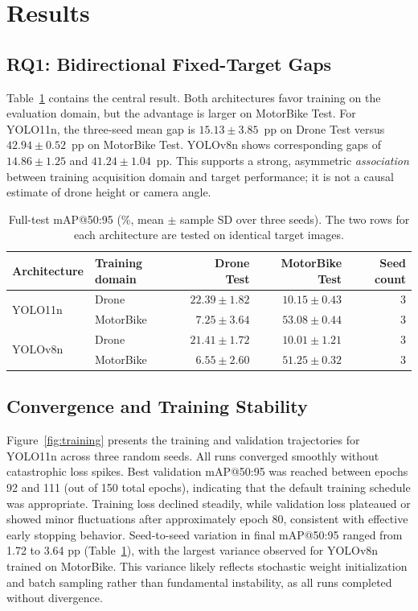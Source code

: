\documentclass[conference,a4paper]{IEEEtran}
\begin{document}
\section{Results}
\subsection{RQ1: Bidirectional Fixed-Target Gaps}
Table~\ref{tab:matrix} contains the central result. Both architectures favor training on the evaluation domain, but the advantage is larger on MotorBike Test. For YOLO11n, the three-seed mean gap is $15.13\pm3.85$~pp on Drone Test versus $42.94\pm0.52$~pp on MotorBike Test. YOLOv8n shows corresponding gaps of $14.86\pm1.25$ and $41.24\pm1.04$~pp. This supports a strong, asymmetric \emph{association} between training acquisition domain and target performance; it is not a causal estimate of drone height or camera angle.

\begin{table}[t]
\centering
\caption{Full-test mAP@50:95 (\%, mean $\pm$ sample SD over three seeds). The two rows for each architecture are tested on identical target images.}\label{tab:matrix}
\begin{tabular}{llrrr}\toprule
Architecture & Training domain & Drone Test & MotorBike Test & Seed count\\\midrule
\multirow{2}{*}{YOLO11n} & Drone & $22.39\pm1.82$ & $10.15\pm0.43$ & 3\\
 & MotorBike & $7.25\pm3.64$ & $53.08\pm0.44$ & 3\\\midrule
\multirow{2}{*}{YOLOv8n} & Drone & $21.41\pm1.72$ & $10.01\pm1.21$ & 3\\
 & MotorBike & $6.55\pm2.60$ & $51.25\pm0.32$ & 3\\\bottomrule
\end{tabular}
\end{table}

\subsection{Convergence and Training Stability}
Figure~\ref{fig:training} presents the training and validation trajectories for YOLO11n across three random seeds. All runs converged smoothly without catastrophic loss spikes. Best validation mAP@50:95 was reached between epochs 92 and 111 (out of 150 total epochs), indicating that the default training schedule was appropriate. Training loss declined steadily, while validation loss plateaued or showed minor fluctuations after approximately epoch 80, consistent with effective early stopping behavior. Seed-to-seed variation in final mAP@50:95 ranged from 1.72 to 3.64 pp (Table~\ref{tab:matrix}), with the largest variance observed for YOLOv8n trained on MotorBike. This variance likely reflects stochastic weight initialization and batch sampling rather than fundamental instability, as all runs completed without divergence.
\end{document}
